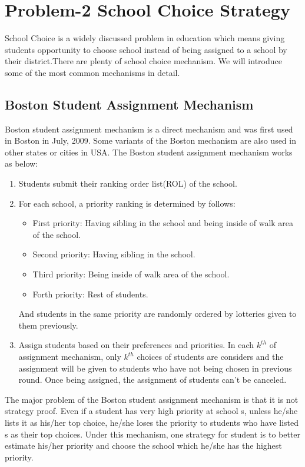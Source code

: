 \documentclass[12pt]{article}
\begin{document}
\section{Problem-2 School Choice Strategy}
School Choice is a widely discussed problem in education which means giving students opportunity to choose school instead of being assigned to a school by their district.\cite{abdulkadirouglu2003school}There are plenty of school choice mechanism. We will introduce some of the most common mechanisms in detail.
\subsection{Boston Student Assignment Mechanism}
Boston student assignment mechanism is a direct mechanism and was first used in Boston in July, 2009. Some variants of the Boston mechanism are also used in other states or cities in USA. The Boston student assignment mechanism works as below:
\begin{enumerate}
    \item Students submit their ranking order list(ROL) of the school.
    \item For each school, a priority ranking is determined by follows:
    \begin{itemize}
        \item First priority: Having sibling in the school and being inside of walk area of the school.
        \item Second priority: Having sibling in the school.
        \item Third priority: Being inside of walk area of the school.
        \item Forth priority: Rest of students.
    \end{itemize}
    And students in the same priority are randomly ordered by lotteries given to them previously.
    \item Assign students based on their preferences and priorities. In each $k^{th}$ of assignment mechanism, only $k^{th}$ choices of students are considers and the assignment will be given to students who have not being chosen in previous round. Once being assigned, the assignment of students can't be canceled.
\end{enumerate}
The major problem of the Boston student assignment mechanism is that it is not strategy proof.
Even if a student has very high priority at school s, unless he/she lists it as his/her top choice, he/she
loses the priority to students who have listed s as their top choices. Under this mechanism, one strategy for student is to better estimate his/her priority and choose the school which he/she has the highest priority.
\end{document}
